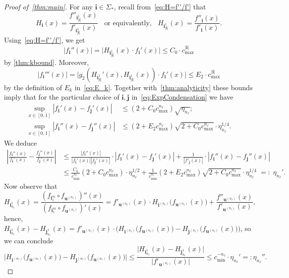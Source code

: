 \documentclass[11pt,]{article}
\def\cref#1{\ref{#1}}%
\theoremstyle{definition}
\theoremstyle{remark}
\newcommand{\0}{\mathbf{0}}
\newcommand{\bi}{\mathbf{i}}
\newcommand{\bj}{\mathbf{j}}
\newcommand{\bu}{\mathbf{u}}
\begin{document}
\begin{proof}[Proof of~\cref{thm:main}]
For any $\bi\in\Sigma_*$, recall from~\cref{eq:H=f''/f'} that
\begin{equation*}
	H_{\bi}(x)= \frac{f''_{\bi_{|\bi|}^1}(x)}{f'_{\bi_{|\bi|}^1}(x)} \;\;\text{ or equivalently,
	}\;\; H_{\bi_{|\bi|}^1}(x) = \frac{f''_{\bi}(x)}{f'_{\bi}(x)}.
\end{equation*}
Using~\eqref{eq:H=f''/f'}, we get 
\begin{equation*}
 |f_{\bi}''(x)| = \big|H_{\bi_{|\bi|}^1}(x)\cdot f_{\bi}'(x)\big|\leq C_0 \cdot c_{\max}^{|\bi|}
\end{equation*}
by \cref{thm:kbound}. Moreover,
\begin{equation*}
  |f_{\bi}'''(x)| = \big|g_2(H_{\bi_{|\bi|}^1}'(x),H_{\bi_{|\bi|}^1}(x))\cdot f_{\bi}'(x)\big| \leq
  E_2\cdot c_{\max}^{|\bi|}
\end{equation*}
by the definition of $E_k$ in~\cref{eq:E_k}. Together with~\cref{thm:analyticity} these bounds imply that
for the particular choice of $\bi,\bj$ in~\cref{eq:ExpCondensation} we have 
\begin{align*}
 \sup_{x\in[0,1]}|f_{\bi}'(x) - f_{\bj}'(x)| &\leq (2+C_0 c_{\max}^{n_\ell})\sqrt{\eta_{n_\ell}}; \\
 \sup_{x\in[0,1]}|f_{\bi}''(x) - f_{\bj}''(x)| &\leq (2+E_2c_{\max}^{n_\ell})\sqrt{2+C_0
 	c_{\max}^{n_\ell}}\cdot
 \eta_{n_\ell}^{1/4}.
\end{align*}
We deduce
\begin{align*}
	\left|\frac{f_{\bi}''(x)}{f_{\bi}'(x)} - \frac{f_{\bj}''(x)}{f_{\bj}'(x)}\right|
	&\leq
	\frac{|f_{\bi}''(x)|}{|f_{\bi}'(x)||f_{\bj}'(x)|}\cdot|f_{\bi}'(x) - f_{\bj}'(x)|
	+\frac{1}{|f'_{\bj}(x)|} \cdot |f_{\bi}''(x) - f_{\bj}''(x)|
	\\
	&
	\leq \frac{C_0}{c_{\min}^{n_\ell}}(2+C_0c_{\max}^{n_\ell})\cdot \eta_{n_\ell}^{1/2}
	+\frac{1}{c_{\min}^{n_\ell}}(2+E_2
	c_{\max}^{n_\ell})\sqrt{2+C_0 c_{\max}^{n_\ell}} \cdot \eta_{n_\ell}^{1/4} \;=:\;\eta_{n_\ell}'.
\end{align*}
Now observe that
\begin{equation*}
H_{\bi_{n_{\ell}}^1}(x) = \frac{(f_{\bi_1^m}\circ f_{\bu^{(n_{\ell})}})''(x)}{(f_{\bi_1^m}\circ
f_{\bu^{(n_{\ell})}})'(x)} = 
f'_{\bu^{(n_{\ell})}}(x) \cdot H_{\bi^{(n_{\ell})}} \big(f_{\bu^{(n_{\ell})}}(x)\big) + \frac{
f''_{\bu^{(n_{\ell})}}(x) }{ f'_{\bu^{(n_{\ell})}}(x)},
\end{equation*}
hence, $H_{\bi_{n_{\ell}}^1}(x)-H_{\bj_{n_{\ell}}^1}(x) = f'_{\bu^{(n_{\ell})}}(x) \cdot \big(
H_{\bi^{(n_{\ell})}} \big(f_{\bu^{(n_{\ell})}}(x)\big) -H_{\bj^{(n_{\ell})}}
\big(f_{\bu^{(n_{\ell})}}(x)\big) \big)$, so we can conclude
\[
\big| H_{\bi^{(n_{\ell})}} \big(f_{\bu^{(n_{\ell})}}(x)\big) -H_{\bj^{(n_{\ell})}}
\big(f_{\bu^{(n_{\ell})}}(x)\big) \big|
 \leq
 \frac{\big|H_{\bi_{n_{\ell}}^1}(x)-H_{\bj_{n_{\ell}}^1}(x)\big|}{\big|f'_{\bu^{(n_{\ell})}}(x)\big|}
 \leq c_{\min}^{-{n_\ell}}
\cdot \eta_{n_\ell}'
=:\eta_{n_\ell}''.
\]


\end{proof}
\end{document}
